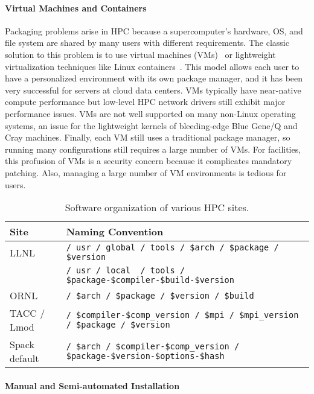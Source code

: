 \paragraph{Virtual Machines and Containers}

Packaging problems arise in HPC because a supercomputer's hardware, OS, and
file system are shared by many users with different requirements.  The classic
solution to this problem is to use virtual
machines (VMs)~\cite{barham2003xen,rosenblum1999vmware,smith2005architecture}
or lightweight virtualization techniques like Linux
containers~\cite{felter2014updated,merkel2014docker}. This model allows each
 user to have a personalized environment with its own package manager, and it
has been very successful for servers at cloud data centers. VMs typically
have near-native compute performance but low-level HPC network drivers still
exhibit major performance issues. VMs are not well supported on many
non-Linux operating systems, an issue for the lightweight
kernels of bleeding-edge Blue Gene/Q and Cray machines.
Finally, each VM still uses a traditional package manager,
so running many configurations still requires a large number of VMs.
For facilities, this profusion of VMs is a security concern because it
complicates mandatory patching. Also, managing  a large number of VM
environments is tedious for users.

\begin{table*}\centering
\begin{tabular}{|l|l|}
\hline
Site           & Naming Convention \\
\hline
\hline
LLNL & {\tt / usr / global / tools / \$arch / \$package / \$version} \\
           & {\tt / usr / local~ / tools / \$package-\$compiler-\$build-\$version } \\
\hline
ORNL~\cite{jones+:cug08}  & {\tt / \$arch / \$package / \$version / \$build} \\
\hline
TACC / Lmod~\cite{mclay:lmod-tutorial}& {\tt / \$compiler-\$comp\_version / \$mpi / \$mpi\_version / \$package / \$version} \\
\hline
\hline
Spack default                  & {\tt / \$arch / \$compiler-\$comp\_version / \$package-\$version-\$options-\$hash} \\
\hline
\end{tabular}
\caption{
	Software organization of various HPC sites.
	\label{tab:naming-conventions}
}
\end{table*}

\paragraph{Manual and Semi-automated Installation}

